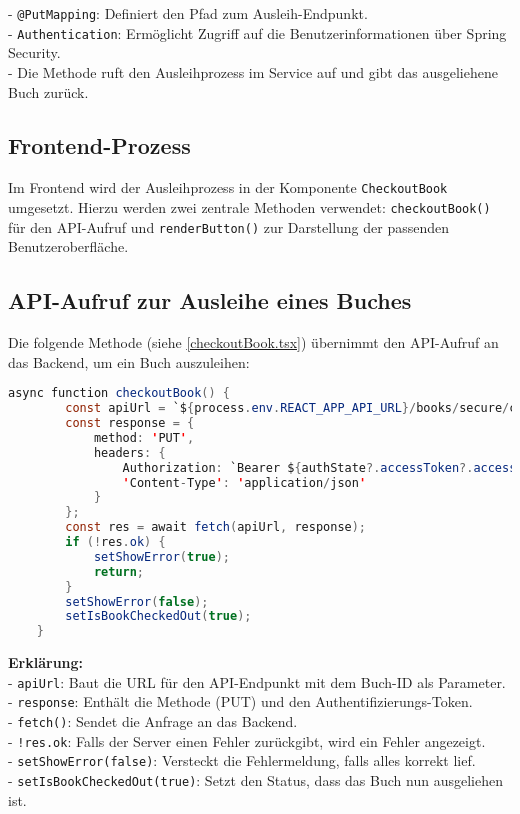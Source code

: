 \noindent - \texttt{@PutMapping}: Definiert den Pfad zum Ausleih-Endpunkt.\\
- \texttt{Authentication}: Ermöglicht Zugriff auf die Benutzerinformationen über Spring Security.\\
- Die Methode ruft den Ausleihprozess im Service auf und gibt das ausgeliehene Buch zurück.

\subsection{Frontend-Prozess}

Im Frontend wird der Ausleihprozess in der Komponente \texttt{CheckoutBook} umgesetzt. Hierzu werden zwei zentrale Methoden verwendet: \texttt{checkoutBook()} für den API-Aufruf und \texttt{renderButton()} zur Darstellung der passenden Benutzeroberfläche.

\subsection*{API-Aufruf zur Ausleihe eines Buches}

Die folgende Methode (siehe \ref{checkoutBook.tsx}) übernimmt den API-Aufruf an das Backend, um ein Buch auszuleihen:

\begin{lstlisting}[language=Java, caption=checkoutBook() Methode in CheckoutBook.tsx, label=checkoutBook.tsx, breaklines=true]
	async function checkoutBook() {
		const apiUrl = `${process.env.REACT_APP_API_URL}/books/secure/checkout?bookId=${bookId}`;
		const response = {
			method: 'PUT',
			headers: {
				Authorization: `Bearer ${authState?.accessToken?.accessToken}`,
				'Content-Type': 'application/json'
			}
		};
		const res = await fetch(apiUrl, response);
		if (!res.ok) {
			setShowError(true);
			return;
		}
		setShowError(false);
		setIsBookCheckedOut(true);
	}
\end{lstlisting}

\noindent \textbf{Erklärung:}\\
- \texttt{apiUrl}: Baut die URL für den API-Endpunkt mit dem Buch-ID als Parameter.\\
- \texttt{response}: Enthält die Methode (PUT) und den Authentifizierungs-Token.\\
- \texttt{fetch()}: Sendet die Anfrage an das Backend.\\
- \texttt{!res.ok}: Falls der Server einen Fehler zurückgibt, wird ein Fehler angezeigt.\\
- \texttt{setShowError(false)}: Versteckt die Fehlermeldung, falls alles korrekt lief.\\
- \texttt{setIsBookCheckedOut(true)}: Setzt den Status, dass das Buch nun ausgeliehen ist.


